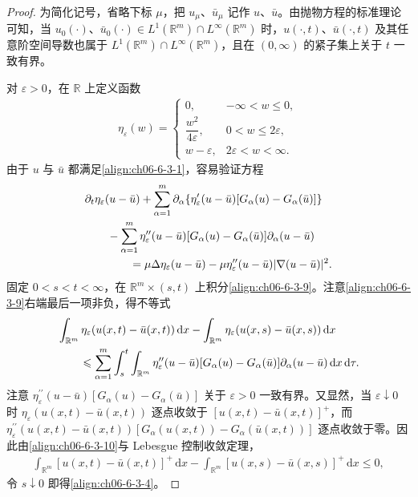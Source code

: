 \documentclass[../../main.tex]{subfiles}
\begin{document}
\begin{proof}
为简化记号，省略下标 $\mu$，把 $u_{\mu}$、$\bar{u}_{\mu}$ 记作 $u$、$\bar{u}$。由抛物方程的标准理论可知，当 $u_{0}(\cdot)$、$\bar{u}_{0}(\cdot)\in L^{1}(\mathbb{R}^{m})\cap L^{\infty}(\mathbb{R}^{m})$ 时，$u(\cdot,t)$、$\bar{u}(\cdot,t)$ 及其任意阶空间导数也属于 $L^{1}(\mathbb{R}^{m})\cap L^{\infty}(\mathbb{R}^{m})$，且在 $(0,\infty)$ 的紧子集上关于 $t$ 一致有界。

对 $\varepsilon>0$，在 $\mathbb{R}$ 上定义函数
\begin{align}
\eta_{\varepsilon}(w)=
\begin{cases}
0, & -\infty<w\leqslant 0,\\[2pt]
\dfrac{w^{2}}{4\varepsilon}, & 0<w\leqslant 2\varepsilon,\\[6pt]
w-\varepsilon, & 2\varepsilon<w<\infty.
\end{cases}
\label{align:ch06-6-3-8}
\end{align}
由于 $u$ 与 $\bar{u}$ 都满足\eqref{align:ch06-6-3-1}，容易验证方程
\begin{align}
&\partial_{t}\eta_{\varepsilon}(u-\bar{u})+\sum_{\alpha=1}^{m}\partial_{\alpha}\{\eta_{\varepsilon}^{\prime}(u-\bar{u})[G_{\alpha}(u)-G_{\alpha}(\bar{u})]\}\notag\\
&\qquad-\sum_{\alpha=1}^{m}\eta_{\varepsilon}^{\prime\prime}(u-\bar{u})[G_{\alpha}(u)-G_{\alpha}(\bar{u})]\partial_{\alpha}(u-\bar{u})\notag\\
&\qquad\qquad=\mu\Delta\eta_{\varepsilon}(u-\bar{u})-\mu\eta_{\varepsilon}^{\prime\prime}(u-\bar{u})|\nabla(u-\bar{u})|^{2}.
\label{align:ch06-6-3-9}
\end{align}
固定 $0<s<t<\infty$，在 $\mathbb{R}^{m}\times(s,t)$ 上积分\eqref{align:ch06-6-3-9}。注意\eqref{align:ch06-6-3-9}右端最后一项非负，得不等式
\begin{align}
&\int_{\mathbb{R}^{m}}\eta_{\varepsilon}(u(x,t)-\bar{u}(x,t))\,\mathrm{d}x-\int_{\mathbb{R}^{m}}\eta_{\varepsilon}(u(x,s)-\bar{u}(x,s))\,\mathrm{d}x\notag\\
&\qquad\leqslant\sum_{\alpha=1}^{m}\int_{s}^{t}\int_{\mathbb{R}^{m}}\eta_{\varepsilon}^{\prime\prime}(u-\bar{u})[G_{\alpha}(u)-G_{\alpha}(\bar{u})]\partial_{\alpha}(u-\bar{u})\,\mathrm{d}x\,\mathrm{d}\tau.
\label{align:ch06-6-3-10}
\end{align}
注意 $\eta_{\varepsilon}^{\prime\prime}(u-\bar{u})[G_{\alpha}(u)-G_{\alpha}(\bar{u})]$ 关于 $\varepsilon>0$ 一致有界。又显然，当 $\varepsilon\downarrow 0$ 时 $\eta_{\varepsilon}(u(x,t)-\bar{u}(x,t))$ 逐点收敛于 $[u(x,t)-\bar{u}(x,t)]^{+}$，而 $\eta_{\varepsilon}^{\prime\prime}(u(x,t)-\bar{u}(x,t))[G_{\alpha}(u(x,t))-G_{\alpha}(\bar{u}(x,t))]$ 逐点收敛于零。因此由\eqref{align:ch06-6-3-10}与 Lebesgue 控制收敛定理，
\begin{align}
\int_{\mathbb{R}^{m}}[u(x,t)-\bar{u}(x,t)]^{+}\,\mathrm{d}x-\int_{\mathbb{R}^{m}}[u(x,s)-\bar{u}(x,s)]^{+}\,\mathrm{d}x\leqslant 0,
\label{align:ch06-6-3-11}
\end{align}
令 $s\downarrow 0$ 即得\eqref{align:ch06-6-3-4}。


\end{proof}
\end{document}
